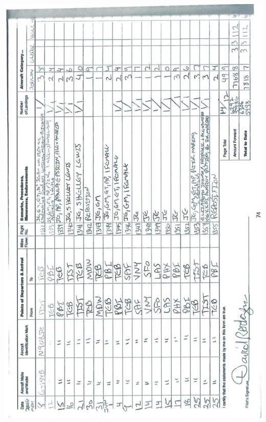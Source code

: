 \documentclass[10pt]{article}
\begin{document}
\includegraphics[max width=\textwidth, center]{2025_02_27_dd68c3d38de88f0516d9g-078}\\
\end{document}
